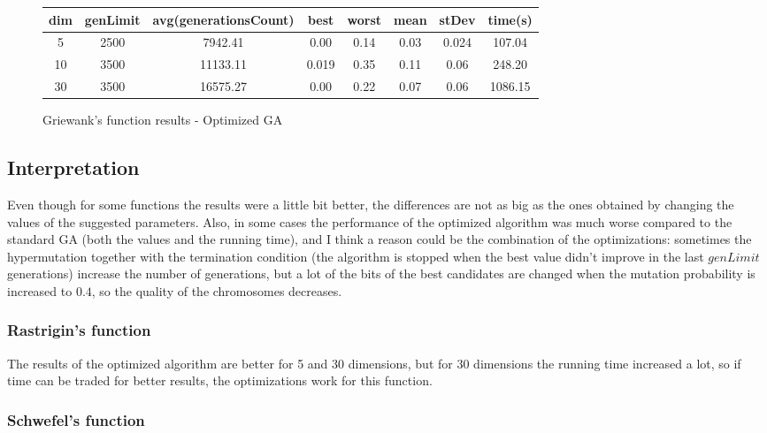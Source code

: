 \documentclass[a4paper]{article}
\begin{document}
	\begin{figure}[!h]
		\centering
		\begin{tabular}{|| c | c | c | c | c | c | c | c ||}
			\hline
			dim & genLimit & avg(generationsCount) & best & worst & mean & stDev & time(s) \\ \hline \hline
			5 & 2500 & 7942.41 & 0.00 & 0.14 & 0.03 & 0.024 & 107.04 \\ \hline
			10 & 3500 & 11133.11 & 0.019 & 0.35 & 0.11 & 0.06 & 248.20 \\ \hline
			30 & 3500 & 16575.27 & 0.00 & 0.22 & 0.07 & 0.06 & 1086.15 \\ \hline
		\end{tabular}
		\caption{Griewank's function results - Optimized GA}
	\end{figure}
	
	\subsection{Interpretation}
	
	Even though for some functions the results were a little bit better, the differences are not as big as the ones obtained by changing the values of the suggested parameters. Also, in some cases the performance of the optimized algorithm was much worse compared to the standard GA (both the values and the running time), and I think a reason could be the combination of the optimizations: sometimes the hypermutation together with the termination condition (the algorithm is stopped when the best value didn't improve in the last $genLimit$ generations) increase the number of generations, but a lot of the bits of the best candidates are changed when the mutation probability is increased to $0.4$, so the quality of the chromosomes decreases.
	
	\subsubsection{Rastrigin's function}	
	
	The results of the optimized algorithm are better for 5 and 30 dimensions, but for 30 dimensions the running time increased a lot, so if time can be traded for better results, the optimizations work for this function.
	
	\subsubsection{Schwefel's function}
	
\end{document}
